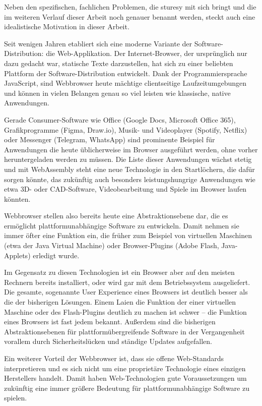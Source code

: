 Neben den spezifischen, fachlichen Problemen, die \ac{sturesy} mit sich bringt und die im weiteren Verlauf dieser Arbeit noch genauer benannt werden, steckt auch eine idealistische Motivation in dieser Arbeit.

Seit wenigen Jahren etabliert sich eine moderne Variante der Software-Distribution: die Web-Applikation. Der Internet-Browser, der ursprünglich nur dazu gedacht war, statische Texte darzustellen, hat sich zu einer beliebten Plattform der Software-Distribution entwickelt. Dank der Programmiersprache JavaScript, sind Webbrowser heute mächtige clientseitige Laufzeitumgebungen und können in vielen Belangen genau so viel leisten wie klassische, native Anwendungen.

Gerade Consumer-Software wie Office (Google Docs, Microsoft Office 365), Grafikprogramme (Figma, Draw.io), Musik- und Videoplayer (Spotify, Netflix) oder Messenger (Telegram, WhatsApp) sind prominente Beispiel für Anwendungen die heute üblicherweise im Browser ausgeführt werden, ohne vorher heruntergeladen werden zu müssen. Die Liste dieser Anwendungen wächst stetig und mit WebAssembly steht eine neue Technologie in den Startlöchern, die dafür sorgen könnte, das zukünftig auch besonders leistungshungrige Anwendungen wie etwa 3D- oder CAD-Software, Videobearbeitung und Spiele im Browser laufen könnten.

Webbrowser stellen also bereits heute eine Abstraktionsebene dar, die es ermöglicht plattformunabhängige Software zu entwickeln. Damit nehmen sie immer öfter eine Funktion ein, die früher zum Beispiel von virtuellen Maschinen (etwa der Java Virtual Machine) oder Browser-Plugins (Adobe Flash, Java-Applets) erledigt wurde.

Im Gegensatz zu diesen Technologien ist ein Browser aber auf den meisten Rechnern bereits installiert, oder wird gar mit dem Betriebssystem ausgeliefert. Die gesamte, sogenannte User Experience eines Browsers ist deutlich besser als die der bisherigen Lösungen. Einem Laien die Funktion der einer virtuellen Maschine oder des Flash-Plugins deutlich zu machen ist schwer – die Funktion eines Browsers ist fast jedem bekannt. Außerdem sind die bisherigen Abstraktionsebenen für plattformübergreifende Software in der Vergangenheit vorallem durch Sicherheitslücken und ständige Updates aufgefallen.

Ein weiterer Vorteil der Webbrowser ist, dass sie offene Web-Standards interpretieren und es sich nicht um eine proprietäre Technologie eines einzigen Herstellers handelt. Damit haben Web-Technologien gute Voraussetzungen um zukünftig eine immer größere Bedeutung für plattformunabhängige Software zu spielen.

